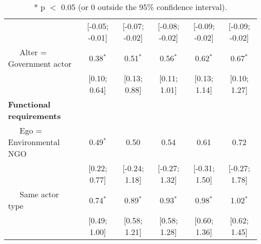 \begin{table}[ht]
\begin{tabular}{lccccc}
   & [-0.05; -0.01] & [-0.07; -0.02] & [-0.08; -0.02] & [-0.09; -0.02] & [-0.09; -0.02] \\ 
  $\;\;\;\;$ Alter = Government actor & 0.38$^{\ast}$ & 0.51$^{\ast}$ & 0.56$^{\ast}$ & 0.62$^{\ast}$ & 0.67$^{\ast}$ \\ 
   & [0.10; 0.64] & [0.13; 0.88] & [0.11; 1.01] & [0.13; 1.14] & [0.10; 1.27] \\ 
  \textbf{Functional requirements} &  &  &  &  &  \\ 
  $\;\;\;\;$ Ego = Environmental NGO & 0.49$^{\ast}$ & 0.50 & 0.54 & 0.61 & 0.72 \\ 
   & [0.22; 0.77] & [-0.24; 1.18] & [-0.27; 1.32] & [-0.31; 1.50] & [-0.27; 1.78] \\ 
  $\;\;\;\;$ Same actor type & 0.74$^{\ast}$ & 0.89$^{\ast}$ & 0.93$^{\ast}$ & 0.98$^{\ast}$ & 1.02$^{\ast}$ \\ 
   & [0.49; 1.00] & [0.58; 1.21] & [0.58; 1.28] & [0.60; 1.36] & [0.62; 1.45] \\ 
   \hline
\hline
\end{tabular}
\endgroup
\caption{* p $<$ 0.05 (or 0 outside the 95\% confidence interval).} 
\label{tab:regTable_latSpace}
\end{table}
